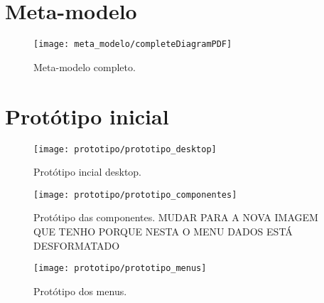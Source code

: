 
%

\chapter{Meta-modelo}
\label{app:meta_modelo_app}

\begin{figure}[htbp]
  \texttt{[image: meta\_modelo/completeDiagramPDF]}
  \caption{Meta-modelo completo.}
  \label{fig:meta_modelo_img}
\end{figure}

\chapter{Protótipo inicial}
\label{app:prototipo_inicial}

\begin{figure}[htbp]
  \texttt{[image: prototipo/prototipo\_desktop]}
  \caption{Protótipo incial desktop.}
  \label{fig:meta_modelo_img}
\end{figure}

\begin{figure}[htbp]
  \texttt{[image: prototipo/prototipo\_componentes]}
  \caption{Protótipo das componentes. MUDAR PARA A NOVA IMAGEM QUE TENHO PORQUE NESTA O MENU DADOS ESTÁ DESFORMATADO}
  \label{fig:meta_modelo_img}
\end{figure}

\begin{figure}[htbp]
  \texttt{[image: prototipo/prototipo\_menus]}
  \caption{Protótipo dos menus.}
  \label{fig:meta_modelo_img}
\end{figure}